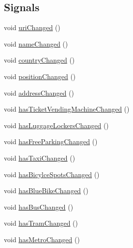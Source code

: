 \subsection*{Signals}
\begin{DoxyCompactItemize}
\item 
void \mbox{\hyperlink{classQRail_1_1StationEngine_1_1Station_a25743385c35feaac93b667a9a828bde8}{uri\+Changed}} ()
\item 
void \mbox{\hyperlink{classQRail_1_1StationEngine_1_1Station_ae25f24fcd0b5dd0e531b6f706ecddbb0}{name\+Changed}} ()
\item 
void \mbox{\hyperlink{classQRail_1_1StationEngine_1_1Station_af78e11d187083959e6868d4590a2587b}{country\+Changed}} ()
\item 
void \mbox{\hyperlink{classQRail_1_1StationEngine_1_1Station_a2cf29fceb09c32f8463c241c89bc4740}{position\+Changed}} ()
\item 
void \mbox{\hyperlink{classQRail_1_1StationEngine_1_1Station_a2b3b24ebf7459ae4d7857b89dc8c6e7c}{address\+Changed}} ()
\item 
void \mbox{\hyperlink{classQRail_1_1StationEngine_1_1Station_ad258fe381fab9d10634c79ef0c436f2e}{has\+Ticket\+Vending\+Machine\+Changed}} ()
\item 
void \mbox{\hyperlink{classQRail_1_1StationEngine_1_1Station_a707ec4770588c1bb293675b2766acf19}{has\+Luggage\+Lockers\+Changed}} ()
\item 
void \mbox{\hyperlink{classQRail_1_1StationEngine_1_1Station_a503389bd75e4c98bc66e1c2e803c57c9}{has\+Free\+Parking\+Changed}} ()
\item 
void \mbox{\hyperlink{classQRail_1_1StationEngine_1_1Station_afb126c23f98971633f13fcf45ed400fe}{has\+Taxi\+Changed}} ()
\item 
void \mbox{\hyperlink{classQRail_1_1StationEngine_1_1Station_af8ad525183b3f1becbbd4856ca3fd5a2}{has\+Bicylce\+Spots\+Changed}} ()
\item 
void \mbox{\hyperlink{classQRail_1_1StationEngine_1_1Station_a29b9d2793153da2639a8b50ea0860636}{has\+Blue\+Bike\+Changed}} ()
\item 
void \mbox{\hyperlink{classQRail_1_1StationEngine_1_1Station_a36cd28ed4095e97704882db3000d7dbb}{has\+Bus\+Changed}} ()
\item 
void \mbox{\hyperlink{classQRail_1_1StationEngine_1_1Station_a1e0a91d242d837ac6b87460147cc420f}{has\+Tram\+Changed}} ()
\item 
void \mbox{\hyperlink{classQRail_1_1StationEngine_1_1Station_acc096fcb18ab5c6863c223b41d009411}{has\+Metro\+Changed}} ()

\end{DoxyCompactItemize}
